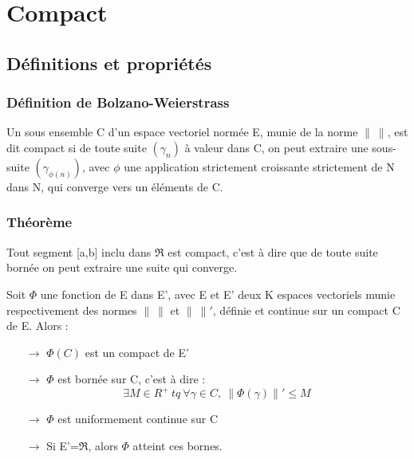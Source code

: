 \chapter{Compact}
\section{Définitions et propriétés}
\subsection{Définition de Bolzano-Weierstrass}
\begin{de}
Un sous ensemble C d'un espace vectoriel normée E, munie de la norme $\parallel~\parallel$, est dit compact si de toute suite $(\gamma_n)$ à valeur dans C, on peut extraire une sous-suite $(\gamma_{\phi(n)})$, avec $\phi$ une application strictement croissante strictement de N dans N, qui converge vers un éléments de C.
\end{de}
\subsection{Théorème}
\begin{theo}
Tout segment [a,b] inclu dans $\Re$ est compact, c'est à dire que de toute suite bornée on peut extraire une suite qui converge.
\end{theo}
\begin{theo}
Soit $\Phi$ une fonction de E dans E', avec E et E' deux K espaces vectoriels munie respectivement des normes $\parallel~\parallel$ et $\parallel~\parallel'$, définie et continue sur un compact C de E. Alors : 
\begin{itemize}
 \item[$\rightarrow$] $\Phi(C)$ est un compact de E'
 \item[$\rightarrow$] $\Phi$ est bornée sur C, c'est à dire : $$\exists M \in R^+~ tq~ \forall \gamma \in C,~ \parallel \Phi(\gamma)\parallel' \leq M$$
 \item[$\rightarrow$] $\Phi$ est uniformement continue sur C
 \item[$\rightarrow$] Si E'=$\Re$, alors $\Phi$ atteint ces bornes.
\end{itemize}
\end{theo}

